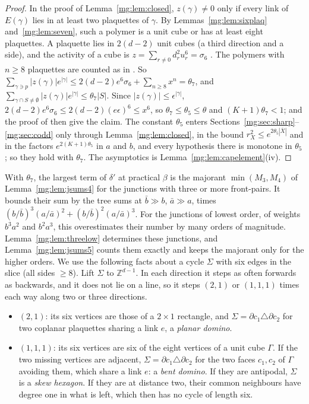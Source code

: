 \documentclass[11pt,a4paper]{article}
\theoremstyle{definition}
\theoremstyle{remark}
\newcommand{\Z}{\mathbb{Z}}
\newcommand{\Fref}[3]{\cite[#1~`#2' (\texttt{#3})]{F}}
\newcommand{\IIIref}[3]{\cite[#1~`#2' (\texttt{#3})]{III}}
\newcommand{\IIIlab}[2]{\cite[#1 \texttt{#2}]{III}}
\begin{document}
\begin{proof}
In the proof of Lemma~\ref{mg:lem:closed}, $z(\gamma)\ne0$ only if every link of $E(\gamma)$ lies in at least two plaquettes of $\gamma$. By Lemmas~\ref{mg:lem:sixplaq} and~\ref{mg:lem:seven},
such a polymer is a unit cube or has at least eight plaquettes. A plaquette lies in $2(d-2)$ unit cubes (a third direction and a side), and the activity of a cube is
$z=\sum_{r\neq0}d_r^2u_r^6=\sigma_6$ \Fref{Proposition}{Cube activity}{prop:cube}. The polymers with $n\ge8$ plaquettes are counted as in
\IIIref{Lemma}{The Kotecký--Preiss condition for plaquette polymers}{al:lem:KPsums}. So $\sum_{\gamma\ni p}|z(\gamma)|e^{|\gamma|}\le2(d-2)e^6\sigma_6+\sum_{n\ge8}x^n=\theta_7$, and
$\sum_{\gamma\cap S\ne\emptyset}|z(\gamma)|e^{|\gamma|}\le\theta_7|S|$. Since $|z(\gamma)|\le\epsilon^{|\gamma|}$, $2(d-2)e^6\sigma_6\le2(d-2)(e\epsilon)^6\le x^6$, so $\theta_7\le\theta_5\le\theta$
and $(K+1)\theta_7<1$; \IIIlab{Lemma}{al:lem:ratio} and the proof of \IIIlab{Proposition}{al:prop:remove} then give the claim. The constant $\theta_5$ enters
Sections~\ref{mg:sec:sharp}--\ref{mg:sec:codd} only through Lemma~\ref{mg:lem:closed}, in the bound $r_X^2\le e^{2\theta_5|\overline X|}$ and in the factors $e^{2(K+1)\theta_5}$ in $a$ and $b$,
and every hypothesis there is monotone in $\theta_5$; so they hold with $\theta_7$. The asymptotics is Lemma~\ref{mg:lem:capelement}(iv).
\end{proof}
With $\theta_7$, the largest term of $\delta'$ at practical $\beta$ is the majorant $\min(M_3,M_4)$ of Lemma~\ref{mg:lem:jsums4} for the junctions with three or more
front-pairs. It bounds their sum by the tree sums at $\bar b\gg b$, $\bar a\gg a$, times $(b/\bar b)^3(a/\bar a)^2+(b/\bar b)^2(a/\bar a)^3$. For the junctions of lowest order, of
weights $b^3a^2$ and $b^2a^3$, this overestimates their number by many orders of magnitude. Lemma~\ref{mg:lem:threelow} determines these junctions, and Lemma~\ref{mg:lem:jsums5}
counts them exactly and keeps the majorant only for the higher orders. We use the following facts about a cycle $\Sigma$ with six edges in the slice (all sides $\ge8$). Lift $\Sigma$
to $\Z^{d-1}$. In each direction it steps as often forwards as backwards, and it does not lie on a line, so it steps $(2,1)$ or $(1,1,1)$ times each way along two or three
directions.
\begin{itemize}
\item $(2,1)$: its six vertices are those of a $2\times1$ rectangle, and $\Sigma=\partial c_1\triangle\partial c_2$ for two coplanar plaquettes sharing a link $e$, a \emph{planar domino}.
\item $(1,1,1)$: its six vertices are six of the eight vertices of a unit cube $\Gamma$. If the two missing vertices are adjacent, $\Sigma=\partial c_1\triangle\partial c_2$ for the two faces
$c_1,c_2$ of $\Gamma$ avoiding them, which share a link $e$: a \emph{bent domino}. If they are antipodal, $\Sigma$ is a \emph{skew hexagon}. If they are at distance two, their common
neighbours have degree one in what is left, which then has no cycle of length six.
\end{itemize}
\end{document}
